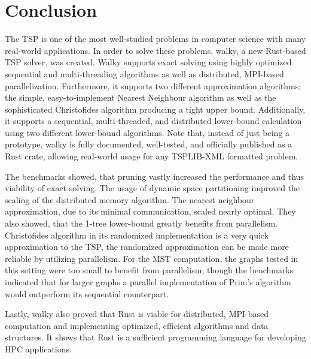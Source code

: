 \section{Conclusion}
The \acf{TSP} is one of the most well-studied problems in computer science with many real-world applications.
In order to solve these problems, walky, a new Rust-based \ac{TSP} solver, was created. Walky supports exact
solving using highly optimized sequential and multi-threading algorithms as well as distributed, \ac{MPI}-based
parallelization. Furthermore, it supports two different approximation algorithms; the simple, easy-to-implement
Nearest Neighbour algorithm as well as the sophisticated Christofides algorithm producing a tight upper bound.
Additionally, it supports a sequential, multi-threaded, and distributed lower-bound calculation using two different
lower-bound algorithms. Note that, instead of just being a prototype, walky is fully documented, well-tested, 
and officially published as a Rust crate, allowing real-world usage for any TSPLIB-XML formatted problem.

The benchmarks showed, that pruning vastly increased the performance and thus viability of exact solving. The usage of dynamic space partitioning improved the scaling of the distributed memory algorithm. The nearest neighbour approximation, due to its minimal communication, scaled nearly optimal.
They also showed, that the 1-tree lower-bound greatly benefits from parallelism.
Christofides algorithm in its randomized implementation is a very quick approximation to the \ac{TSP},
the randomized approximation can be made more reliable by utilizing parallelism.
For the \ac{MST} computation, the graphs tested in this setting were too small to
benefit from parallelism, though the benchmarks indicated that for larger graphs
a parallel implementation of Prim's algorithm would outperform its sequential counterpart.

Lastly, walky also proved that Rust is viable for distributed, \ac{MPI}-based computation and implementing
optimized, efficient algorithms and data structures. It shows that Rust is a sufficient programming language
for developing \ac{HPC} applications.

